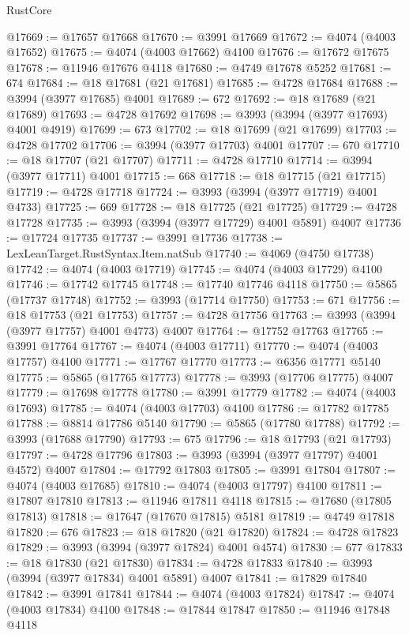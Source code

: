 \begin{lexlean}{RustCore}
\begin{coremodule}
@17669 := @17657 @17668
@17670 := @3991 @17669
@17672 := @4074 (@4003 @17652)
@17675 := @4074 (@4003 @17662) @4100
@17676 := @17672 @17675
@17678 := @11946 @17676 @4118
@17680 := @4749 @17678 @5252
@17681 := 674
@17684 := @18 @17681 (@21 @17681)
@17685 := @4728 @17684
@17688 := @3994 (@3977 @17685) @4001
@17689 := 672
@17692 := @18 @17689 (@21 @17689)
@17693 := @4728 @17692
@17698 := @3993 (@3994 (@3977 @17693) @4001 @4919)
@17699 := 673
@17702 := @18 @17699 (@21 @17699)
@17703 := @4728 @17702
@17706 := @3994 (@3977 @17703) @4001
@17707 := 670
@17710 := @18 @17707 (@21 @17707)
@17711 := @4728 @17710
@17714 := @3994 (@3977 @17711) @4001
@17715 := 668
@17718 := @18 @17715 (@21 @17715)
@17719 := @4728 @17718
@17724 := @3993 (@3994 (@3977 @17719) @4001 @4733)
@17725 := 669
@17728 := @18 @17725 (@21 @17725)
@17729 := @4728 @17728
@17735 := @3993 (@3994 (@3977 @17729) @4001 @5891) @4007
@17736 := @17724 @17735
@17737 := @3991 @17736
@17738 := LexLeanTarget.RustSyntax.Item.natSub
@17740 := @4069 (@4750 @17738)
@17742 := @4074 (@4003 @17719)
@17745 := @4074 (@4003 @17729) @4100
@17746 := @17742 @17745
@17748 := @17740 @17746 @4118
@17750 := @5865 (@17737 @17748)
@17752 := @3993 (@17714 @17750)
@17753 := 671
@17756 := @18 @17753 (@21 @17753)
@17757 := @4728 @17756
@17763 := @3993 (@3994 (@3977 @17757) @4001 @4773) @4007
@17764 := @17752 @17763
@17765 := @3991 @17764
@17767 := @4074 (@4003 @17711)
@17770 := @4074 (@4003 @17757) @4100
@17771 := @17767 @17770
@17773 := @6356 @17771 @5140
@17775 := @5865 (@17765 @17773)
@17778 := @3993 (@17706 @17775) @4007
@17779 := @17698 @17778
@17780 := @3991 @17779
@17782 := @4074 (@4003 @17693)
@17785 := @4074 (@4003 @17703) @4100
@17786 := @17782 @17785
@17788 := @8814 @17786 @5140
@17790 := @5865 (@17780 @17788)
@17792 := @3993 (@17688 @17790)
@17793 := 675
@17796 := @18 @17793 (@21 @17793)
@17797 := @4728 @17796
@17803 := @3993 (@3994 (@3977 @17797) @4001 @4572) @4007
@17804 := @17792 @17803
@17805 := @3991 @17804
@17807 := @4074 (@4003 @17685)
@17810 := @4074 (@4003 @17797) @4100
@17811 := @17807 @17810
@17813 := @11946 @17811 @4118
@17815 := @17680 (@17805 @17813)
@17818 := @17647 (@17670 @17815) @5181
@17819 := @4749 @17818
@17820 := 676
@17823 := @18 @17820 (@21 @17820)
@17824 := @4728 @17823
@17829 := @3993 (@3994 (@3977 @17824) @4001 @4574)
@17830 := 677
@17833 := @18 @17830 (@21 @17830)
@17834 := @4728 @17833
@17840 := @3993 (@3994 (@3977 @17834) @4001 @5891) @4007
@17841 := @17829 @17840
@17842 := @3991 @17841
@17844 := @4074 (@4003 @17824)
@17847 := @4074 (@4003 @17834) @4100
@17848 := @17844 @17847
@17850 := @11946 @17848 @4118

\end{coremodule}
\end{lexlean}
